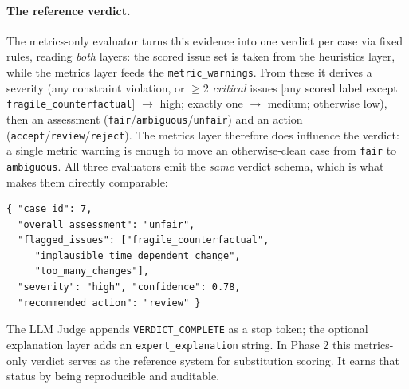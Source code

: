 \documentclass[letterpaper]{article}
\begin{document}
\paragraph{The reference verdict.}
The metrics-only evaluator turns this evidence into one verdict per case via fixed rules, reading \emph{both} layers: the scored issue set is taken from the heuristics layer, while the metrics layer feeds the \texttt{metric\_warnings}. From these it derives a severity (any constraint violation, or $\ge$2 \emph{critical} issues [any scored label except \texttt{fragile\_counterfactual}] $\rightarrow$ high; exactly one $\rightarrow$ medium; otherwise low), then an assessment (\texttt{fair}/\texttt{ambiguous}/\texttt{unfair}) and an action (\texttt{accept}/\texttt{review}/\texttt{reject}). The metrics layer therefore does influence the verdict: a single metric warning is enough to move an otherwise-clean case from \texttt{fair} to \texttt{ambiguous}. All three evaluators emit the \emph{same} verdict schema, which is what makes them directly comparable:
{\footnotesize
\begin{verbatim}
{ "case_id": 7,
  "overall_assessment": "unfair",
  "flagged_issues": ["fragile_counterfactual",
     "implausible_time_dependent_change",
     "too_many_changes"],
  "severity": "high", "confidence": 0.78,
  "recommended_action": "review" }
\end{verbatim}}
\noindent The LLM Judge appends \texttt{VERDICT\_COMPLETE} as a stop token; the optional explanation layer adds an \texttt{expert\_explanation} string. In Phase 2 this metrics-only verdict serves as the reference system for substitution scoring. It earns that status by being reproducible and auditable.
\end{document}
